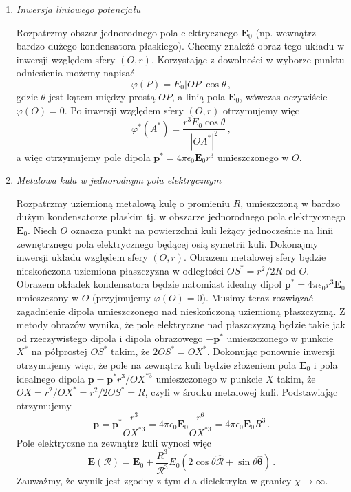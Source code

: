 \documentclass[../main.tex]{subfiles}
\begin{document}
\begin{enumerate}
    \item \textit{Inwersja liniowego potencjału}
    \medskip
    
    Rozpatrzmy obszar jednorodnego pola elektrycznego \(\mathbf{E}_0\) (np. wewnątrz bardzo dużego kondensatora płaskiego). Chcemy znaleźć obraz tego układu w inwersji względem sfery \((O,r)\). Korzystając z dowolności w wyborze punktu odniesienia możemy napisać
    \begin{equation*}
        \varphi(P)=E_0|OP|\cos\theta\,,
    \end{equation*}
    gdzie \(\theta\) jest kątem między prostą \(OP\), a linią pola \(\mathbf{E}_0\), wówczas oczywiście \(\varphi(O)=0\). Po inwersji względem sfery \((O,r)\) otrzymujemy więc
    \begin{equation*}
        \varphi^*(A^*)=\frac{r^3E_0\cos\theta}{|OA^{*}|^2}\,,
    \end{equation*}
    a więc otrzymujemy pole dipola \(\mathbf{p}^*=4\pi\epsilon_0\mathbf{E}_0r^3\) umieszczonego w \(O\).
    \item \textit{Metalowa kula w jednorodnym polu elektrycznym}
    \medskip
    
    Rozpatrzmy uziemioną metalową kulę o promieniu \(R\), umieszczoną w bardzo dużym kondensatorze płaskim tj. w obszarze jednorodnego pola elektrycznego \(\mathbf{E}_0\). Niech \(O\) oznacza punkt na powierzchni kuli leżący jednocześnie na linii zewnętrznego pola elektrycznego będącej osią symetrii kuli. Dokonajmy inwersji układu względem sfery \((O,r)\). Obrazem metalowej sfery będzie nieskończona uziemiona płaszczyzna w odległości \(OS^*=r^2/2R\) od \(O\). Obrazem okładek kondensatora będzie natomiast idealny dipol \(\mathbf{p}^*=4\pi\epsilon_0r^3\mathbf{E}_0\) umieszczony w \(O\) (przyjmujemy \(\varphi(O)=0\)). Musimy teraz rozwiązać zagadnienie dipola umieszczonego nad nieskończoną uziemioną płaszczyzną. Z metody obrazów wynika, że pole elektryczne nad płaszczyzną będzie takie jak od rzeczywistego dipola i dipola obrazowego \(-\mathbf{p}^*\) umieszczonego w punkcie \(X^*\) na półprostej \(OS^*\) takim, że \(2OS^*=OX^*\). Dokonując ponownie inwersji otrzymujemy więc, że pole na zewnątrz kuli będzie złożeniem pola \(\mathbf{E}_0\) i pola idealnego dipola \(\mathbf{p}=\mathbf{p}^*r^3/OX^{*3}\) umieszczonego w punkcie \(X\) takim, że \(OX=r^2/OX^*=r^2/2OS^*=R\), czyli w środku metalowej kuli. Podstawiając otrzymujemy
    \begin{equation*}
        \mathbf{p}=\mathbf{p}^*\frac{r^3}{OX^{*3}}=4\pi\epsilon_0\mathbf{E}_0\frac{r^6}{OX^{*3}}=4\pi\epsilon_0\mathbf{E}_0R^3\,.
    \end{equation*}
    Pole elektryczne na zewnątrz kuli wynosi więc
    \begin{equation*}
        \mathbf{E}(\boldsymbol{\mathcal{R}})=\mathbf{E}_0+\frac{R^3}{\mathcal{R}^3}E_0(2\cos\theta\boldsymbol{\hat{\mathcal{R}}}+\sin\theta\boldsymbol{\hat{\theta}})\,.
    \end{equation*}
    Zauważmy, że wynik jest zgodny z tym dla dielektryka w granicy \(\chi\to\infty\).
    

\end{enumerate}
\end{document}
